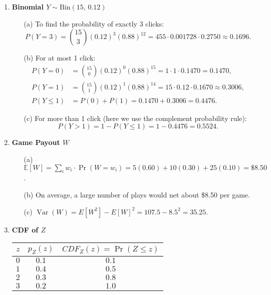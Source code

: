 \documentclass{article}
\begin{document}
\begin{enumerate}
\item \textbf{Binomial\; \(Y\sim\mathrm{Bin}(15,\,0.12)\)}
  \begin{enumerate}
    \item[(a)] To find the probability of exactly 3 clicks:
          \[
          P(Y=3)=\binom{15}{3}(0.12)^3(0.88)^{12}
          = 455 \cdot 0.001728 \cdot 0.2750 \approx 0.1696.
          \]
    \item[(b)] For at most 1 click:
          \begin{align*}
          P(Y=0) &= \binom{15}{0}(0.12)^0(0.88)^{15} = 1 \cdot 1 \cdot 0.1470 = 0.1470,\\
          P(Y=1) &= \binom{15}{1}(0.12)^1(0.88)^{14} = 15 \cdot 0.12 \cdot 0.1670 \approx 0.3006,\\
          P(Y\le 1) &= P(0) + P(1) = 0.1470 + 0.3006 = 0.4476.
          \end{align*}
    \item[(c)] For more than 1 click (here we use the complement probability rule):
          \[
          P(Y > 1) = 1 - P(Y \le 1) = 1 - 0.4476 = 0.5524.
          \]
  \end{enumerate}



\item \textbf{Game Payout \(W\)}
      \begin{enumerate}
        \item[(a)] \(\mathbb E[W]= \sum_{i}  w_i \cdot \Pr(W=w_i) = 5(0.60)+10(0.30)+25(0.10)=\$8.50\).
        \item[(b)] On average, a large number of plays would net about \$8.50 per game.
        \item[(c)] \(\operatorname{Var}(W)=E[W^2]-E[W]^2=107.5-8.5^2=35.25\).
      \end{enumerate}

\item \textbf{CDF of \(Z\)}
  \begin{center}
  \begin{tabular}{c|c|c}
    $z$ & $p_Z(z)$ & $CDF_Z(z) = \Pr(Z \le z)$ \\
    \hline
    $0$ & $0.1$ & $0.1$ \\
    $1$ & $0.4$ & $0.5$ \\
    $2$ & $0.3$ & $0.8$ \\
    $3$ & $0.2$ & $1.0$
  \end{tabular}
  \end{center}


\end{enumerate}
\end{document}

